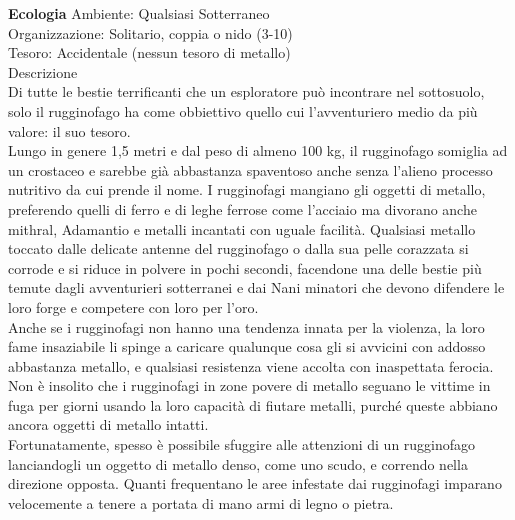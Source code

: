 \begin{multicols}{2}
\textbf{Ecologia}
Ambiente: Qualsiasi Sotterraneo\\
Organizzazione: Solitario, coppia o nido (3-10)\\
Tesoro: Accidentale (nessun tesoro di metallo)\\
Descrizione\\
Di tutte le bestie terrificanti che un esploratore può incontrare nel sottosuolo, solo il rugginofago ha come obbiettivo quello cui l’avventuriero medio da più valore: il suo tesoro.\\
Lungo in genere 1,5 metri e dal peso di almeno 100 kg, il rugginofago somiglia ad un crostaceo e sarebbe già abbastanza spaventoso anche senza l’alieno processo nutritivo da cui prende il nome. I rugginofagi mangiano gli oggetti di metallo, preferendo quelli di ferro e di leghe ferrose come l’acciaio ma divorano anche mithral, Adamantio e metalli incantati con uguale facilità. Qualsiasi metallo toccato dalle delicate antenne del rugginofago o dalla sua pelle corazzata si corrode e si riduce in polvere in pochi secondi, facendone una delle bestie più temute dagli avventurieri sotterranei e dai Nani minatori che devono difendere le loro forge e competere con loro per l’oro.\\
Anche se i rugginofagi non hanno una tendenza innata per la violenza, la loro fame insaziabile li spinge a caricare qualunque cosa gli si avvicini con addosso abbastanza metallo, e qualsiasi resistenza viene accolta con inaspettata ferocia. Non è insolito che i rugginofagi in zone povere di metallo seguano le vittime in fuga per giorni usando la loro capacità di fiutare metalli, purché queste abbiano ancora oggetti di metallo intatti.\\
Fortunatamente, spesso è possibile sfuggire alle attenzioni di un rugginofago lanciandogli un oggetto di metallo denso, come uno scudo, e correndo nella direzione opposta. Quanti frequentano le aree infestate dai rugginofagi imparano velocemente a tenere a portata di mano armi di legno o pietra.\\


\end{multicols}
